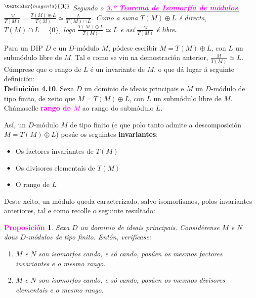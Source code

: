 \documentclass[twoside]{report}
\newcommand{\magbf}[1]{\textcolor{magenta}{\textbf{#1}}} %
\theoremstyle{mystyle}
\newtheorem{prop}{\magbf{Proposición}}[chapter]
\newenvironment{proposition}
{\begin{mdframed}[linecolor = magenta,backgroundcolor = classicrose, linewidth = 2mm]\begin{prop}}
{\end{prop}\end{mdframed}}
\begin{document}
\noindent $^{\magbf{[1]}}$ \textit{Segundo o \hyperref[th3.3]{\magbf{3.º Teorema de Isomorfía de módulos}}, $\displaystyle \frac{M}{T(M)} = \frac{T(M) \oplus L}{T(M)} \simeq \frac{L}{T(M) \cap L}$. Como a suma $T(M) \oplus L$ é directa, $T(M) \cap L = \{0\}$, logo $\displaystyle \frac{T(M) \oplus L}{T(M)} \simeq L$ e así $\displaystyle \frac{M}{T(M)}$ é libre}.\\

\vspace{3mm}

\noindent Para un DIP $D$ e un $D$-módulo $M$, pódese escribir $M = T(M) \oplus L$, con $L$ un submódulo libre de $M$. Tal e como se viu na demostración anterior, $\displaystyle \frac{M}{T(M)} \simeq L$. Cúmprese que o rango de $L$ é un invariante de $M$, o que dá lugar á seguinte definición:\\

\noindent \textbf{Definición 4.10}. Sexa $D$ un dominio de ideais principais e $M$ un $D$-módulo de tipo finito, de xeito que $M = T(M) \oplus L$, con $L$ un submódulo libre de $M$. Chámaselle \magbf{rango de $M$} ao rango do submódulo $L$.\\

\begin{mdframed}[linecolor = classicrose, linewidth = 1mm]
\noindent Así, un $D$-módulo $M$ de tipo finito (e que polo tanto admite a descomposición $M = T(M) \oplus L$) posúe os seguintes \textbf{invariantes}:
\begin{itemize}
    \item Os factores invariantes de $T(M)$
    \item Os divisores elementais de $T(M)$
    \item O rango de $L$
\end{itemize}
\end{mdframed}

\vspace{2mm}

\noindent Deste xeito, un módulo queda caracterizado, salvo isomorfismos, polos invariantes anteriores, tal e como recolle o seguinte resultado:\\

\begin{proposition} \label{prop4.3}
Sexa $D$ un dominio de ideais principais. Considérense $M$ e $N$ dous $D$-módulos de tipo finito. Entón, verifícase:
\begin{enumerate}
    \item $M$ e $N$ son isomorfos cando, e só cando, posúen os mesmos factores invariantes e o mesmo rango.
    \item $M$ e $N$ son isomorfos cando, e só cando, posúen os mesmos divisores elementais e o mesmo rango.
\end{enumerate}
\end{proposition}
\end{document}
